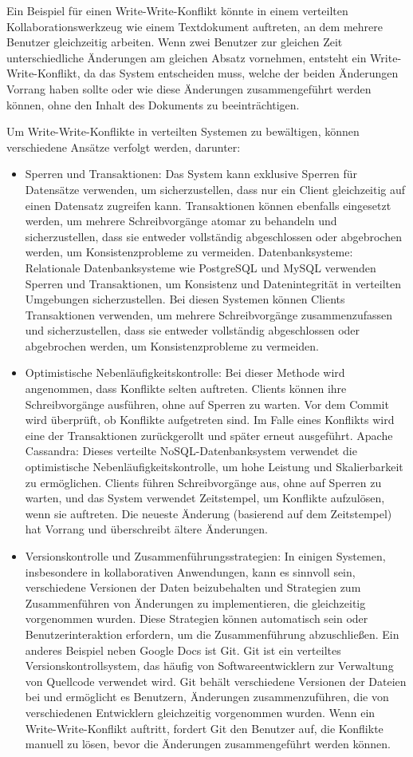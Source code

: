 Ein Beispiel für einen Write-Write-Konflikt könnte in einem verteilten Kollaborationswerkzeug wie einem Textdokument auftreten, an dem mehrere Benutzer gleichzeitig arbeiten. Wenn zwei Benutzer zur gleichen Zeit unterschiedliche Änderungen am gleichen Absatz vornehmen, entsteht ein Write-Write-Konflikt, da das System entscheiden muss, welche der beiden Änderungen Vorrang haben sollte oder wie diese Änderungen zusammengeführt werden können, ohne den Inhalt des Dokuments zu beeinträchtigen.

Um Write-Write-Konflikte in verteilten Systemen zu bewältigen, können verschiedene Ansätze verfolgt werden, darunter:
\begin{itemize}
\item Sperren und Transaktionen: Das System kann exklusive Sperren für Datensätze verwenden, um sicherzustellen, dass nur ein Client gleichzeitig auf einen Datensatz zugreifen kann. Transaktionen können ebenfalls eingesetzt werden, um mehrere Schreibvorgänge atomar zu behandeln und sicherzustellen, dass sie entweder vollständig abgeschlossen oder abgebrochen werden, um Konsistenzprobleme zu vermeiden.
Datenbanksysteme: Relationale Datenbanksysteme wie PostgreSQL und MySQL verwenden Sperren und Transaktionen, um Konsistenz und Datenintegrität in verteilten Umgebungen sicherzustellen. Bei diesen Systemen können Clients Transaktionen verwenden, um mehrere Schreibvorgänge zusammenzufassen und sicherzustellen, dass sie entweder vollständig abgeschlossen oder abgebrochen werden, um Konsistenzprobleme zu vermeiden.
\item Optimistische Nebenläufigkeitskontrolle: Bei dieser Methode wird angenommen, dass Konflikte selten auftreten. Clients können ihre Schreibvorgänge ausführen, ohne auf Sperren zu warten. Vor dem Commit wird überprüft, ob Konflikte aufgetreten sind. Im Falle eines Konflikts wird eine der Transaktionen zurückgerollt und später erneut ausgeführt.
Apache Cassandra: Dieses verteilte NoSQL-Datenbanksystem verwendet die optimistische Nebenläufigkeitskontrolle, um hohe Leistung und Skalierbarkeit zu ermöglichen. Clients führen Schreibvorgänge aus, ohne auf Sperren zu warten, und das System verwendet Zeitstempel, um Konflikte aufzulösen, wenn sie auftreten. Die neueste Änderung (basierend auf dem Zeitstempel) hat Vorrang und überschreibt ältere Änderungen.
\item Versionskontrolle und Zusammenführungsstrategien: In einigen Systemen, insbesondere in kollaborativen Anwendungen, kann es sinnvoll sein, verschiedene Versionen der Daten beizubehalten und Strategien zum Zusammenführen von Änderungen zu implementieren, die gleichzeitig vorgenommen wurden. Diese Strategien können automatisch sein oder Benutzerinteraktion erfordern, um die Zusammenführung abzuschließen.
Ein anderes Beispiel neben Google Docs ist Git. Git ist ein verteiltes Versionskontrollsystem, das häufig von Softwareentwicklern zur Verwaltung von Quellcode verwendet wird. Git behält verschiedene Versionen der Dateien bei und ermöglicht es Benutzern, Änderungen zusammenzuführen, die von verschiedenen Entwicklern gleichzeitig vorgenommen wurden. Wenn ein Write-Write-Konflikt auftritt, fordert Git den Benutzer auf, die Konflikte manuell zu lösen, bevor die Änderungen zusammengeführt werden können.
\end{itemize}
